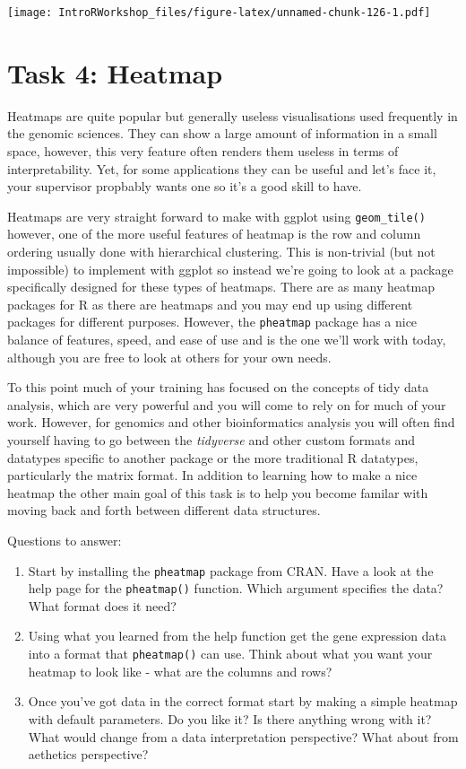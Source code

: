 \documentclass[
]{book}
\providecommand{\tightlist}{%
  \setlength{\itemsep}{0pt}\setlength{\parskip}{0pt}}
\begin{document}
\texttt{[image: IntroRWorkshop\_files/figure-latex/unnamed-chunk-126-1.pdf]}

\section*{Task 4: Heatmap}\label{task-4-heatmap}

Heatmaps are quite popular but generally useless visualisations used frequently in the genomic sciences. They can show a large amount of information in a small space, however, this very feature often renders them useless in terms of interpretability. Yet, for some applications they can be useful and let's face it, your supervisor propbably wants one so it's a good skill to have.

Heatmaps are very straight forward to make with ggplot using \texttt{geom\_tile()} however, one of the more useful features of heatmap is the row and column ordering usually done with hierarchical clustering. This is non-trivial (but not impossible) to implement with ggplot so instead we're going to look at a package specifically designed for these types of heatmaps. There are as many heatmap packages for R as there are heatmaps and you may end up using different packages for different purposes. However, the \texttt{pheatmap} package has a nice balance of features, speed, and ease of use and is the one we'll work with today, although you are free to look at others for your own needs.

To this point much of your training has focused on the concepts of tidy data analysis, which are very powerful and you will come to rely on for much of your work. However, for genomics and other bioinformatics analysis you will often find yourself having to go between the \emph{tidyverse} and other custom formats and datatypes specific to another package or the more traditional R datatypes, particularly the matrix format. In addition to learning how to make a nice heatmap the other main goal of this task is to help you become familar with moving back and forth between different data structures.

Questions to answer:

\begin{enumerate}
\def\labelenumi{\arabic{enumi}.}
\tightlist
\item
  Start by installing the \texttt{pheatmap} package from CRAN. Have a look at the help page for the \texttt{pheatmap()} function. Which argument specifies the data? What format does it need?
\item
  Using what you learned from the help function get the gene expression data into a format that \texttt{pheatmap()} can use. Think about what you want your heatmap to look like - what are the columns and rows?
\item
  Once you've got data in the correct format start by making a simple heatmap with default parameters. Do you like it? Is there anything wrong with it? What would change from a data interpretation perspective? What about from aethetics perspective?
\end{enumerate}
\end{document}
